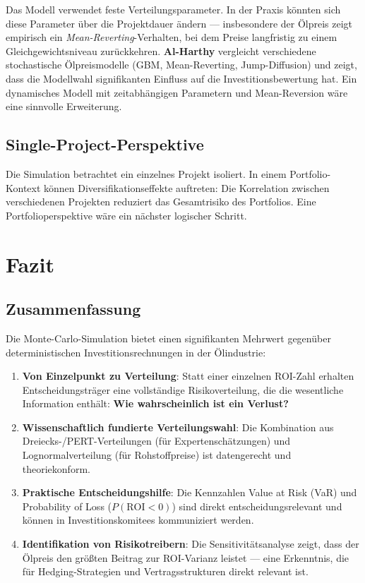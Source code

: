 \documentclass[11pt,a4paper]{article}
\begin{document}
Das Modell verwendet feste Verteilungsparameter. In der Praxis könnten sich diese Parameter über die Projektdauer ändern — insbesondere der Ölpreis zeigt empirisch ein \textit{Mean-Reverting}-Verhalten, bei dem Preise langfristig zu einem Gleichgewichtsniveau zurückkehren. \textbf{Al-Harthy} \cite{alharthy2007} vergleicht verschiedene stochastische Ölpreismodelle (GBM, Mean-Reverting, Jump-Diffusion) und zeigt, dass die Modellwahl signifikanten Einfluss auf die Investitionsbewertung hat. Ein dynamisches Modell mit zeitabhängigen Parametern und Mean-Reversion wäre eine sinnvolle Erweiterung.

\subsection{Single-Project-Perspektive}

Die Simulation betrachtet ein einzelnes Projekt isoliert. In einem Portfolio-Kontext können Diversifikationseffekte auftreten: Die Korrelation zwischen verschiedenen Projekten reduziert das Gesamtrisiko des Portfolios. Eine Portfolioperspektive wäre ein nächster logischer Schritt.

\section{Fazit}

\subsection{Zusammenfassung}

Die Monte-Carlo-Simulation bietet einen signifikanten Mehrwert gegenüber deterministischen Investitionsrechnungen in der Ölindustrie:

\begin{enumerate}[label=\arabic*., itemsep=4pt]
  \item \textbf{Von Einzelpunkt zu Verteilung}: Statt einer einzelnen ROI-Zahl erhalten Entscheidungsträger eine vollständige Risikoverteilung, die die wesentliche Information enthält: \textbf{Wie wahrscheinlich ist ein Verlust?}
  \item \textbf{Wissenschaftlich fundierte Verteilungswahl}: Die Kombination aus Dreiecks-/PERT-Verteilungen (für Expertenschätzungen) und Lognormalverteilung (für Rohstoffpreise) ist datengerecht und theoriekonform.
  \item \textbf{Praktische Entscheidungshilfe}: Die Kennzahlen Value at Risk (VaR) und Probability of Loss ($P(\text{ROI} < 0)$) sind direkt entscheidungsrelevant und können in Investitionskomitees kommuniziert werden.
  \item \textbf{Identifikation von Risikotreibern}: Die Sensitivitätsanalyse zeigt, dass der Ölpreis den größten Beitrag zur ROI-Varianz leistet — eine Erkenntnis, die für Hedging-Strategien und Vertragsstrukturen direkt relevant ist.
\end{enumerate}
\end{document}
